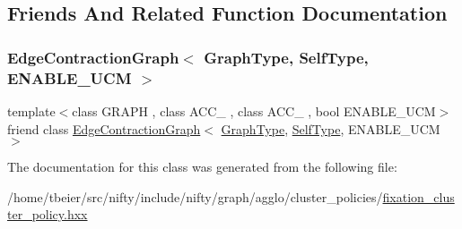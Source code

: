 \subsection{Friends And Related Function Documentation}
\mbox{\label{classnifty_1_1graph_1_1agglo_1_1FixationClusterPolicy_a6939aa4c6113ba9c44fd5e048687ba92}} 
\subsubsection{\texorpdfstring{Edge\+Contraction\+Graph$<$ Graph\+Type, Self\+Type, E\+N\+A\+B\+L\+E\+\_\+\+U\+C\+M $>$}{EdgeContractionGraph< GraphType, SelfType, ENABLE\_UCM >}}
{\footnotesize\ttfamily template$<$class G\+R\+A\+PH , class A\+C\+C\+\_ , class A\+C\+C\+\_ , bool E\+N\+A\+B\+L\+E\+\_\+\+U\+CM$>$ \\
friend class \hyperlink{classnifty_1_1graph_1_1EdgeContractionGraph}{Edge\+Contraction\+Graph}$<$ \hyperlink{classnifty_1_1graph_1_1agglo_1_1FixationClusterPolicy_a1b20f47fae0c5f5a247ca049bb60400b}{Graph\+Type}, \hyperlink{classnifty_1_1graph_1_1agglo_1_1FixationClusterPolicy}{Self\+Type}, E\+N\+A\+B\+L\+E\+\_\+\+U\+CM $>$\hspace{0.3cm}{\ttfamily [friend]}}



The documentation for this class was generated from the following file\+:\begin{DoxyCompactItemize}
\item 
/home/tbeier/src/nifty/include/nifty/graph/agglo/cluster\+\_\+policies/\hyperlink{fixation__cluster__policy_8hxx}{fixation\+\_\+cluster\+\_\+policy.\+hxx}\end{DoxyCompactItemize}
